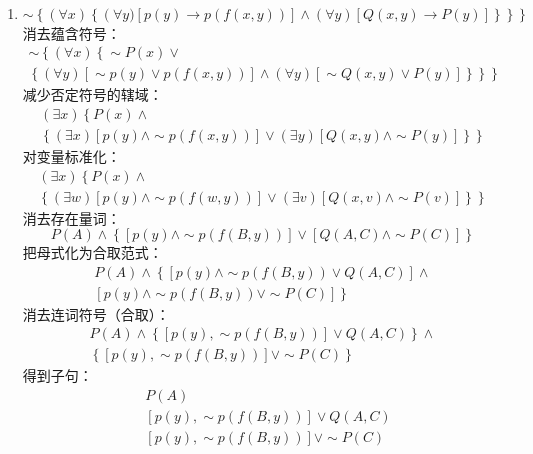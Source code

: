\begin{solution}
\begin{enumerate}
         \item $\sim\left\{\left(\forall x\right)\left\{\left(\forall y)\left[p\left(y\right) \to p(f(x,y))\right] \wedge \left(\forall y \right) \left[Q(x,y) \to P(y) \right]\right\}\right\}\right\}$ \\
         	消去蕴含符号：
         	\begin{multline*}
         	\sim \left\{ (\forall x) \left\{ \sim P(x) \vee \right. \right. \\
         	\left. \left. \left\{ (\forall y) \left[ \sim p(y) \vee p \left( f(x,y) \right) \right] \wedge (\forall y) \left[ \sim Q(x,y) \vee P(y) \right] \right\} \right\} \right\} 
         	\end{multline*}
         	减少否定符号的辖域：
         	\begin{multline*}
         	(\exists x) \left\{ P(x) \wedge \right. \\
         	\left. \left\{ (\exists x) \left[ p(y) \wedge \sim p \left( f(x,y) \right) \right] \vee (\exists y) \left[ Q(x,y) \wedge \sim P(y) \right] \right\} \right\} 
         	\end{multline*}
         	对变量标准化：
         	\begin{multline*} 
         	(\exists x) \left\{ P(x) \wedge \right. \\
         	\left. \left\{ (\exists w) \left[ p(y) \wedge \sim p \left( f(w,y) \right) \right] \vee (\exists v) \left[ Q(x,v) \wedge \sim P(v) \right] \right\} \right\} 
         	\end{multline*}
         	消去存在量词：
         	\[ P(A) \wedge \left\{ \left[ p(y) \wedge \sim p \left( f(B,y) \right) \right] \vee \left[ Q(A,C)\wedge \sim P(C)  \right] \right\} \]
         	把母式化为合取范式：
         	\begin{multline*}
         	P(A) \wedge \left\{ \left[ p(y) \wedge \sim p \left( f(B,y) \right) \vee Q(A,C) \right] \wedge \right. \\
         	\left. \left[ p(y) \wedge \sim p\left( f(B,y) \right) \vee \sim P(C) \right] \right\} 
         	\end{multline*}
         	消去连词符号（合取）：
         	\begin{multline*}
         	P(A) \wedge \left\{ \left[ p(y) , \sim p \left( f(B,y) \right) \right] \vee Q(A,C) \right\} \wedge \\
         	\left\{ \left[ p(y) , \sim p\left( f(B,y) \right) \right] \vee \sim P(C) \right\}
         	\end{multline*}
         	得到子句：
         	\begin{align*}
         	& P(A) \\
         	& \left[ p(y) , \sim p \left( f(B,y) \right) \right] \vee Q(A,C)  \\
         	& \left[ p(y) , \sim p\left( f(B,y) \right) \right] \vee \sim P(C)
         	\end{align*}
	\end{enumerate}
\end{solution}

